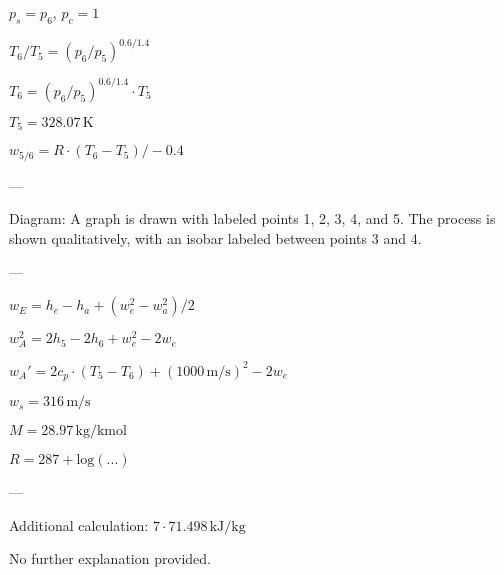 \( p_s = p_6 \), \( p_c = 1 \)  

\( T_6 / T_5 = (p_6 / p_5)^{0.6 / 1.4} \)  

\( T_6 = (p_6 / p_5)^{0.6 / 1.4} \cdot T_5 \)  

\( T_5 = 328.07 \, \text{K} \)  

\( w_{5/6} = R \cdot (T_6 - T_5) / -0.4 \)  

---

Diagram:  
A graph is drawn with labeled points 1, 2, 3, 4, and 5. The process is shown qualitatively, with an isobar labeled between points 3 and 4.  

---

\( w_E = h_e - h_a + (w_e^2 - w_a^2) / 2 \)  

\( w_A^2 = 2h_5 - 2h_6 + w_e^2 - 2w_e \)  

\( w_A' = 2c_p \cdot (T_5 - T_6) + (1000 \, \text{m/s})^2 - 2w_e \)  

\( w_s = 316 \, \text{m/s} \)  

\( M = 28.97 \, \text{kg/kmol} \)  

\( R = 287 + \text{log}(...) \)  

---

Additional calculation:  
\( 7 \cdot 71.498 \, \text{kJ/kg} \)  

No further explanation provided.
